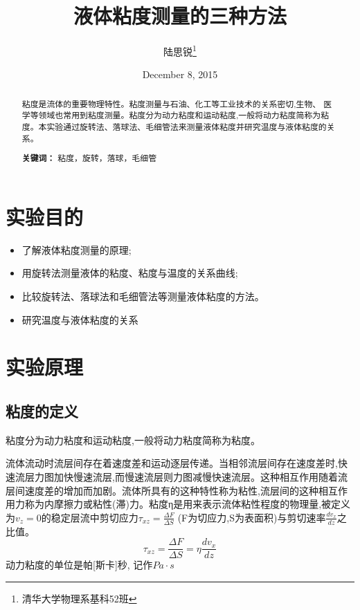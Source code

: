 \documentclass[12pt,a4paper]{ctexart}
\title{液体粘度测量的三种方法}
\author{陆思锐\thanks{清华大学物理系\quad 基科52班 \quad 2015012206} }
\date{December 8, 2015}
\def\tightlist{}
\begin{document}
\maketitle



\begin{abstract}
粘度是流体的重要物理特性。粘度测量与石油、化工等工业技术的关系密切,生物、
医学等领域也常用到粘度测量。粘度分为动力粘度和运动粘度,一般将动力粘度简称为粘度。本实验通过旋转法、落球法、毛细管法来测量液体粘度并研究温度与液体粘度的关系。

\textbf{关键词：} 粘度，旋转，落球，毛细管
\end{abstract}



\tableofcontents
\section{实验目的}\label{ux5b9eux9a8cux76eeux7684}

\begin{itemize}
\tightlist
\item
  了解液体粘度测量的原理;
\item
  用旋转法测量液体的粘度、粘度与温度的关系曲线;
\item
  比较旋转法、落球法和毛细管法等测量液体粘度的方法。
\item
  研究温度与液体粘度的关系
\end{itemize}

\section{实验原理}\label{ux5b9eux9a8cux539fux7406}

\subsection{粘度的定义}\label{ux7c98ux5ea6ux7684ux5b9aux4e49}

粘度分为动力粘度和运动粘度,一般将动力粘度简称为粘度。

流体流动时流层间存在着速度差和运动逐层传递。当相邻流层间存在速度差时,快速流层力图加快慢速流层,而慢速流层则力图减慢快速流层。这种相互作用随着流层间速度差的增加而加剧。流体所具有的这种特性称为粘性,流层间的这种相互作用力称为内摩擦力或粘性(滞)力。粘度η是用来表示流体粘性程度的物理量,被定义为\(v_z=0\)的稳定层流中剪切应力\(\tau_{xz}=\frac{\Delta F}{\Delta S}\)
(F为切应力,S为表面积)与剪切速率\(\frac{d v_x}{d z}\)之比值。
\[\tau_{xz}=\frac{\Delta F}{\Delta S}=\eta\frac{d v_x}{d z}\]
动力粘度的单位是帕{[}斯卡{]}秒, 记作\(Pa\cdot s\)
\end{document}
